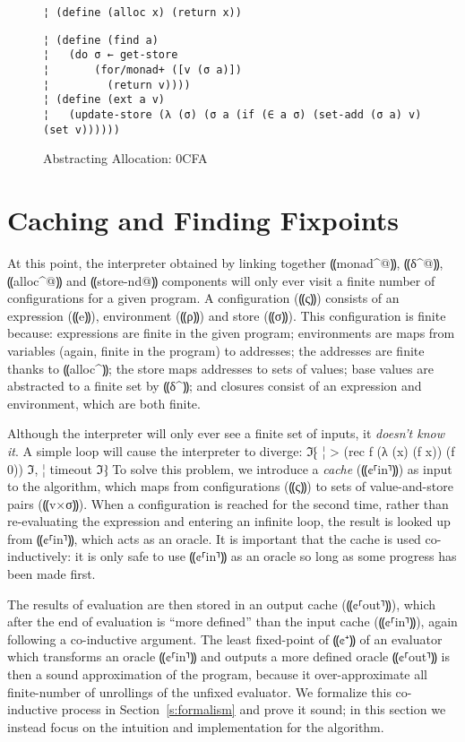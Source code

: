\begin{figure} %
\begin{lstlisting}
¦ (define (alloc x) (return x))
\end{lstlisting}
\vspace{0.75em}
\figskip{}
\begin{lstlisting}
¦ (define (find a)
¦   (do σ ← get-store
¦       (for/monad+ ([v (σ a)])
¦         (return v))))
¦ (define (ext a v)
¦   (update-store (λ (σ) (σ a (if (∈ a σ) (set-add (σ a) v) (set v))))))
\end{lstlisting}
\vspace{-0.75em}
\caption{Abstracting Allocation: 0CFA}
\label{f:0cfa-abs}
\vspace{-1em}
\end{figure} %

\section{Caching and Finding Fixpoints}\label{s:cache}

At this point, the interpreter obtained by linking together ⸨monad^@⸩, ⸨δ^@⸩,
⸨alloc^@⸩ and ⸨store-nd@⸩ components will only ever visit a finite number of
configurations for a given program. A configuration (⸨ς⸩) consists of an
expression (⸨e⸩), environment (⸨ρ⸩) and store (⸨σ⸩). This configuration is
finite because: expressions are finite in the given program; environments are
maps from variables (again, finite in the program) to addresses; the addresses
are finite thanks to ⸨alloc^⸩; the store maps addresses to sets of values; base
values are abstracted to a finite set by ⸨δ^⸩; and closures consist of an
expression and environment, which are both finite.

Although the interpreter will only ever see a finite set of inputs, it
\emph{doesn't know it}.  A simple loop will cause the interpreter to diverge:
ℑ⁅
¦ > (rec f (λ (x) (f x)) (f 0))
ℑ,
¦ timeout
ℑ⁆
To solve this problem, we introduce a \emph{cache} (⸨¢⸢in⸣⸩) as input to the
algorithm, which maps from configurations (⸨ς⸩) to sets of value-and-store
pairs (⸨v×σ⸩). When a configuration is reached for the second time, rather than
re-evaluating the expression and entering an infinite loop, the result is
looked up from ⸨¢⸢in⸣⸩, which acts as an oracle. It is important that the cache
is used co-inductively: it is only safe to use ⸨¢⸢in⸣⸩ as an oracle so long as
some progress has been made first. 

The results of evaluation are then stored in an output cache (⸨¢⸢out⸣⸩), which
after the end of evaluation is “more defined” than the input cache (⸨¢⸢in⸣⸩),
again following a co-inductive argument. The least fixed-point of ⸨¢⁺⸩ of an
evaluator which transforms an oracle ⸨¢⸢in⸣⸩ and outputs a more defined oracle
⸨¢⸢out⸣⸩ is then a sound approximation of the program, because it
over-approximate all finite-number of unrollings of the unfixed evaluator. We
formalize this co-inductive process in Section~\ref{s:formalism} and prove it
sound; in this section we instead focus on the intuition and implementation for
the algorithm.

